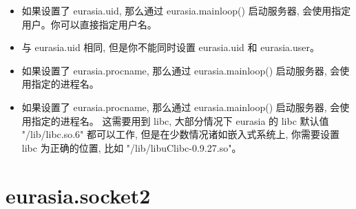 \documentclass{manual}
\begin{document}
\begin{itemize}

\item {}

如果设置了 eurasia.uid, 那么通过 eurasia.mainloop() 启动服务器,
会使用指定用户。你可以直接指定用户名。



\item {}

与 eurasia.uid 相同, 但是你不能同时设置 eurasia.uid 和 eurasia.user。

\item {}

如果设置了 eurasia.procname, 那么通过  eurasia.mainloop() 启动服务器,
会使用指定的进程名。


\item {}

如果设置了 eurasia.procname, 那么通过  eurasia.mainloop() 启动服务器, 会使用指定的进程名。
这需要用到 libc, 大部分情况下 eurasia 的 libc 默认值 "/lib/libc.so.6" 都可以工作,
但是在少数情况诸如嵌入式系统上, 你需要设置 libc 为正确的位置, 比如 "/lib/libuClibc-0.9.27.so"。



\end{itemize}

\section{eurasia.socket2}
\end{document}
